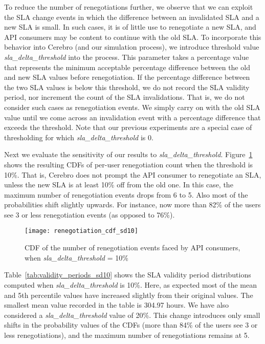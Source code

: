 To reduce the number of renegotiations further, we observe that we can exploit the
SLA change events in which the difference between an invalidated SLA
and a new SLA is small. In such cases, it is of little use to renegotiate 
a new SLA, and API consumers may be content to continue with the old SLA.
To incorporate this behavior into Cerebro (and our simulation process), we introduce threshold
value \textit{sla\_delta\_threshold} into the process. This parameter takes a percentage value that
represents the minimum acceptable percentage difference between the old and new SLA 
values before renegotiation.
If the percentage difference between the two SLA values is below this threshold, we do not record the
SLA validity period, nor increment the count of the SLA invalidations. That is, we do not consider
such cases as renegotiation events. We simply carry on with the
old SLA value until we come across an invalidation event with a percentage difference
that exceeds the threshold. 
Note that our previous experiments are 
a special case of thresholding for which \textit{sla\_delta\_threshold} is 0.

Next we evaluate the sensitivity of our results to \textit{sla\_delta\_threshold}.
Figure~\ref{fig:renegotiation_cdf_sd10}
shows the resulting CDFs of per-user renegotiation count when the threshold is 10\%. 
That is, Cerebro does not prompt the API consumer to renegotiate an SLA, unless the new SLA is at 
least 10\% off from the old one. In this case, the
maximum number of renegotiation events drops from 6 to 5.
Also most of the probabilities shift slightly upwards. For instance,
now more than 82\% of the users see 3 or less renegotiation events (as opposed to 76\%).

\begin{figure}
\centering
\texttt{[image: renegotiation\_cdf\_sd10]}
\caption{CDF of the number of renegotiation events faced by API consumers, when  \textit{sla\_delta\_threshold} = 10\%}
\label{fig:renegotiation_cdf_sd10}
\end{figure}

Table~\ref{tab:validity_periods_sd10} shows the SLA validity period distributions computed
when  \textit{sla\_delta\_threshold} is 10\%. Here, as expected  most of the mean and 5th
percentile values have increased slightly from their original values. The smallest mean value
recorded in the table is 304.97 hours. 
We have also considered a \textit{sla\_delta\_threshold} value of 20\%. This change
introduces only small shifts in the probability values of 
the CDFs (more than 84\% of the users see 3 or less renegotiations), 
and the maximum number of renegotiations remains at 5.

